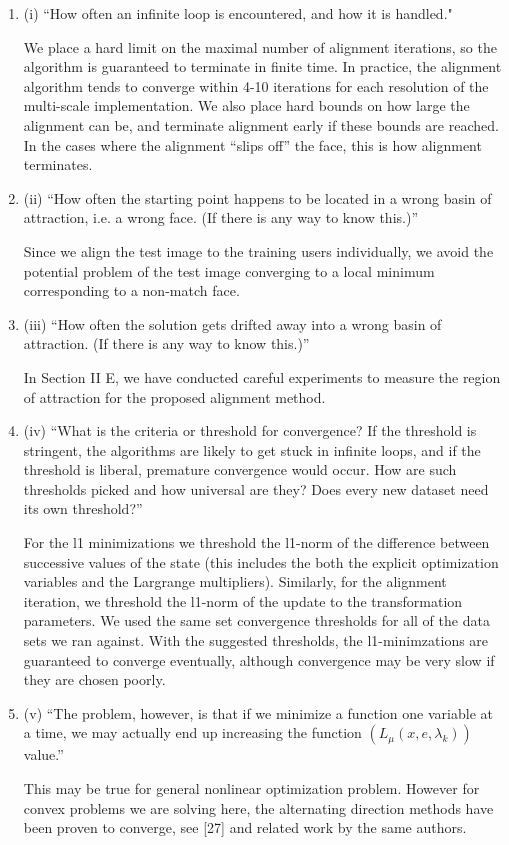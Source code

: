 \documentclass[11pt]{article}
\begin{document}
\begin{enumerate}
\item (i) ``How often an infinite loop is encountered, and how it is handled."

We place a hard limit on the maximal number of alignment iterations, so the
algorithm is guaranteed to terminate in finite time.  In practice, the
alignment algorithm tends to converge within 4-10 iterations for each
resolution of the multi-scale implementation.  We also place hard bounds on how
large the alignment can be, and terminate alignment early if these bounds are
reached.  In the cases where the alignment ``slips off'' the face, this is how
alignment terminates.  

\item (ii) ``How often the starting point happens to be located in a wrong basin of
attraction, i.e. a wrong face. (If there is any way to know this.)''


Since we align the test image to the training users individually, we avoid the
potential problem of the test image converging to a local minimum corresponding
to a non-match face.

\item (iii) ``How often the solution gets drifted away into a wrong basin of
attraction. (If there is any way to know this.)''

In Section II E, we have conducted careful experiments to measure the region of attraction
for the proposed alignment method. 

\item (iv) ``What is the criteria or threshold for convergence? If the threshold is
stringent, the algorithms are likely to get stuck in infinite loops, and if the
threshold is liberal, premature convergence would occur. How are such
thresholds picked and how universal are they? Does every new dataset need its
own threshold?''

For the l1 minimizations we threshold the l1-norm of the difference between
successive values of the state (this includes the both the explicit
optimization variables and the Largrange multipliers).  Similarly, for the
alignment iteration, we threshold the l1-norm of the update to the
transformation parameters.  We used the same set convergence thresholds for all
of the data sets we ran against.  With the suggested thresholds, the l1-minimzations are
guaranteed to converge eventually, although convergence may be very slow if they
are chosen poorly.  

\item (v) ``The problem, however, is that if we minimize a function one variable at
a time, we may actually end up increasing the function $(L_{\mu}(x,e,\lambda_{k}))$ value.''

This may be true for general nonlinear optimization problem. However for convex problems
we are solving here, the alternating direction methods have been proven to converge, see
[27] and related work by the same authors. 


\end{enumerate}
\end{document}
